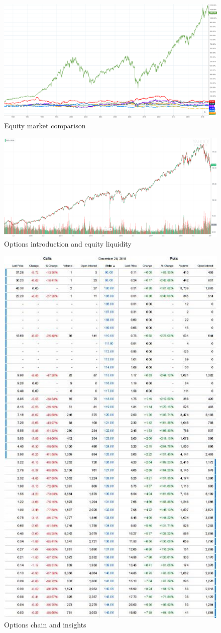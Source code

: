\documentclass{article}
\begin{document}
\vspace{10pt}

\begin{figure}[!htb]
    \centering
    \includegraphics[width=\textwidth]{imgs/22.png}
    \caption{Equity market comparison}
\end{figure}

\vspace{10pt}

\begin{figure}[!htb]
    \centering
    \includegraphics[width=\textwidth]{imgs/23.png}
    \caption{Options introduction and equity liquidity}
\end{figure}

\vspace{10pt}

\begin{figure}[!htb]
    \centering
    \includegraphics[width=.42\textwidth]{imgs/24.png}
    \caption{Options chain and insights}
\end{figure}
\end{document}
